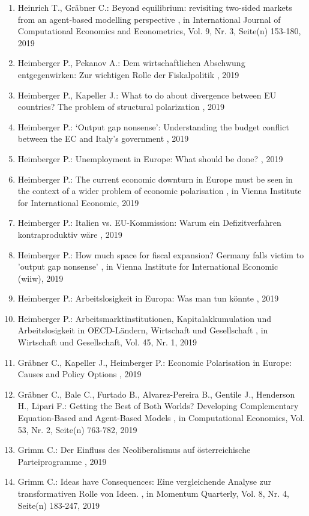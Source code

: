 \begin{enumerate}[leftmargin=*, labelsep=0.5cm]
	 \item Heinrich T., Gräbner C.:  Beyond equilibrium: revisiting two-sided markets from an agent-based modelling perspective  , in International Journal of Computational Economics and Econometrics, Vol. 9, Nr. 3, Seite(n) 153-180, 2019
	 \item Heimberger P., Pekanov A.:  Dem wirtschaftlichen Abschwung entgegenwirken: Zur wichtigen Rolle der Fiskalpolitik  , 2019
	 \item Heimberger P., Kapeller J.:  What to do about divergence between EU countries? The problem of structural polarization  , 2019
	 \item Heimberger P.:  ‘Output gap nonsense': Understanding the budget conflict between the EC and Italy’s government  , 2019
	 \item Heimberger P.:  Unemployment in Europe: What should be done?  , 2019
	 \item Heimberger P.:  The current economic downturn in Europe must be seen in the context of a wider problem of economic polarisation  , in Vienna Institute for International Economic, 2019
	 \item Heimberger P.:  Italien vs. EU-Kommission: Warum ein Defizitverfahren kontraproduktiv wäre  , 2019
	 \item Heimberger P.:  How much space for fiscal expansion? Germany falls victim to 'output gap nonsense’  , in Vienna Institute for International Economic (wiiw), 2019
	 \item Heimberger P.:  Arbeitslosigkeit in Europa: Was man tun könnte  , 2019
	 \item Heimberger P.:  Arbeitsmarktinstitutionen, Kapitalakkumulation und Arbeitslosigkeit in OECD-Ländern, Wirtschaft und Gesellschaft  , in Wirtschaft und Gesellschaft, Vol. 45, Nr. 1, 2019
	 \item Gräbner C., Kapeller J., Heimberger P.:  Economic Polarisation in Europe: Causes and Policy Options  , 2019
	 \item Gräbner C., Bale C., Furtado B., Alvarez-Pereira B., Gentile J., Henderson H., Lipari F.:  Getting the Best of Both Worlds? Developing Complementary Equation-Based and Agent-Based Models  , in Computational Economics, Vol. 53, Nr. 2, Seite(n) 763-782, 2019
	 \item Grimm C.:  Der Einfluss des Neoliberalismus auf österreichische Parteiprogramme  , 2019
	 \item Grimm C.:  Ideas have Consequences: Eine vergleichende Analyse zur transformativen Rolle von Ideen.  , in Momentum Quarterly, Vol. 8, Nr. 4, Seite(n) 183-247, 2019

\end{enumerate}
